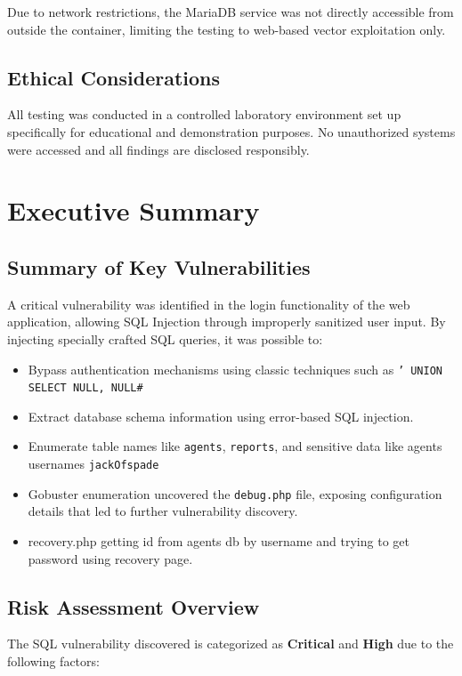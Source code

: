 \documentclass[12pt]{article}
\begin{document}
Due to network restrictions, the MariaDB service was not directly accessible from outside the container, limiting the testing to web-based vector exploitation only.

\subsection{Ethical Considerations}
All testing was conducted in a controlled laboratory environment set up specifically for educational and demonstration purposes. No unauthorized systems were accessed and all findings are disclosed responsibly.


\section{Executive Summary}

\subsection{Summary of Key Vulnerabilities}
A critical vulnerability was identified in the login functionality of the web application, allowing SQL Injection through improperly sanitized user input. By injecting specially crafted SQL queries, it was possible to:

\begin{itemize}
 \item Bypass authentication mechanisms using classic techniques such as \texttt{' UNION SELECT NULL, NULL\#}
 \item Extract database schema information using error-based SQL injection.
 \item Enumerate table names like \texttt{agents}, \texttt{reports}, and sensitive data like agents usernames \texttt{jackOfspade}
 \item Gobuster enumeration uncovered the \texttt{debug.php} file, exposing configuration details that led to further vulnerability discovery.
 \item{recovery.php} getting id from agents db by username and trying to get password using recovery page.
\end{itemize}

\subsection{Risk Assessment Overview}
The SQL vulnerability discovered is categorized as \textbf{Critical} and \textbf{High} due to the following factors:
\end{document}
